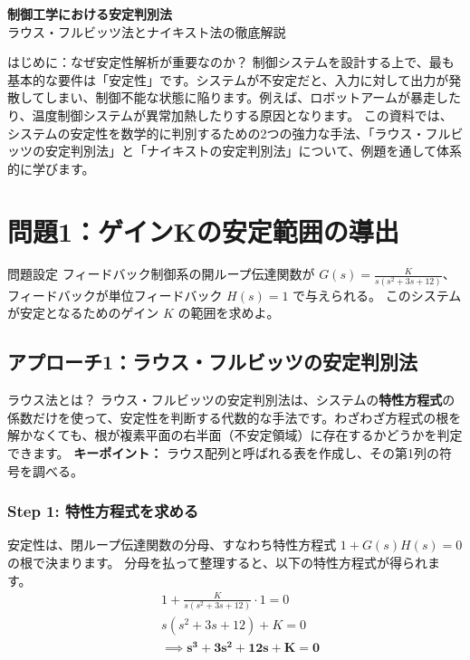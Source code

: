 \documentclass[11pt,a4paper]{ltjsarticle}
\begin{document}
\begin{center}
    {\Huge \bfseries 制御工学における安定判別法} \\
    \vspace{2mm}
    {\Large ラウス・フルビッツ法とナイキスト法の徹底解説}
\end{center}

\vspace{5mm}

\begin{tcolorbox}{はじめに：なぜ安定性解析が重要なのか？}
    制御システムを設計する上で、最も基本的な要件は「安定性」です。システムが不安定だと、入力に対して出力が発散してしまい、制御不能な状態に陥ります。例えば、ロボットアームが暴走したり、温度制御システムが異常加熱したりする原因となります。
    この資料では、システムの安定性を数学的に判別するための2つの強力な手法、「ラウス・フルビッツの安定判別法」と「ナイキストの安定判別法」について、例題を通して体系的に学びます。
\end{tcolorbox}

\section{問題1：ゲインKの安定範囲の導出}

\begin{example}{問題設定}
    フィードバック制御系の開ループ伝達関数が $G(s) = \frac{K}{s(s^2+3s+12)}$、フィードバックが単位フィードバック $H(s)=1$ で与えられる。
    \vspace{2mm}
    このシステムが安定となるためのゲイン $K$ の範囲を求めよ。
\end{example}

\subsection{アプローチ1：ラウス・フルビッツの安定判別法}

\begin{tcolorbox}{ラウス法とは？}
    ラウス・フルビッツの安定判別法は、システムの\textbf{特性方程式}の係数だけを使って、安定性を判断する代数的な手法です。わざわざ方程式の根を解かなくても、根が複素平面の右半面（不安定領域）に存在するかどうかを判定できます。
    \textbf{キーポイント：} ラウス配列と呼ばれる表を作成し、その第1列の符号を調べる。
\end{tcolorbox}

\subsubsection{Step 1: 特性方程式を求める}
安定性は、閉ループ伝達関数の分母、すなわち特性方程式 $1+G(s)H(s)=0$ の根で決まります。
分母を払って整理すると、以下の特性方程式が得られます。
\begin{align*}
    &1 + \frac{K}{s(s^2+3s+12)} \cdot 1 = 0 \\
    &s(s^2+3s+12) + K = 0 \\
    &\implies \bm{s^3 + 3s^2 + 12s + K = 0}
\end{align*}
\end{document}

